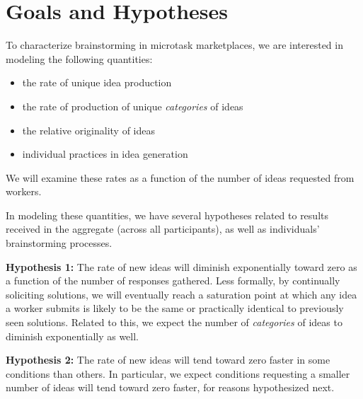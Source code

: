 \section{Goals and Hypotheses}

To characterize brainstorming in microtask marketplaces, we are interested in modeling the following quantities:
\begin{itemize}
\item the rate of unique idea production
\item the rate of production of unique \emph{categories} of ideas
\item the relative originality of ideas
\item individual practices in idea generation
\end{itemize}

We will examine these rates as a function of the number of ideas requested from workers.



In modeling these quantities, we have several hypotheses related to results received in the aggregate (across all participants), as well as individuals' brainstorming processes.

\textbf{Hypothesis 1:} The rate of new ideas will diminish exponentially toward zero as a function of the number of responses gathered. Less formally, by continually soliciting solutions, we will eventually reach a saturation point at which any idea a worker submits is likely to be the same or practically identical to previously seen solutions. Related to this, we expect the number of \emph{categories} of ideas to diminish exponentially as well.

\textbf{Hypothesis 2:} The rate of new ideas will tend toward zero faster in some conditions than others. In particular, we expect conditions requesting a smaller number of ideas will tend toward zero faster, for reasons hypothesized next.

